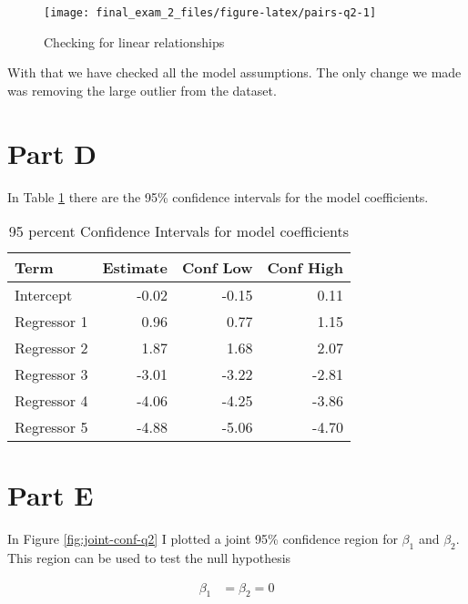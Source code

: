 \documentclass[]{book}
\begin{document}
\begin{figure}

{\centering \texttt{[image: final\_exam\_2\_files/figure-latex/pairs-q2-1]} 

}

\caption{Checking for linear relationships}\label{fig:pairs-q2}
\end{figure}

With that we have checked all the model assumptions. The only change we made was removing the large outlier from the dataset.

\hypertarget{part-d-1}{%
\section{Part D}\label{part-d-1}}

In Table \ref{tab:conf-ints-q2} there are the 95\% confidence intervals for the model coefficients.

\begin{table}

\caption{\label{tab:conf-ints-q2}95 percent Confidence Intervals for model coefficients}
\centering
\begin{tabular}[t]{lrrr}
\toprule
Term & Estimate & Conf Low & Conf High\\
\midrule
Intercept & -0.02 & -0.15 & 0.11\\
Regressor 1 & 0.96 & 0.77 & 1.15\\
Regressor 2 & 1.87 & 1.68 & 2.07\\
Regressor 3 & -3.01 & -3.22 & -2.81\\
Regressor 4 & -4.06 & -4.25 & -3.86\\
Regressor 5 & -4.88 & -5.06 & -4.70\\
\bottomrule
\end{tabular}
\end{table}

\hypertarget{part-e}{%
\section{Part E}\label{part-e}}

In Figure \ref{fig:joint-conf-q2} I plotted a joint 95\% confidence region for \(\beta_1\) and \(\beta_2\). This region can be used to test the null hypothesis

\begin{align}
  \beta_1 &= \beta_2 = 0
\end{align}
\end{document}
